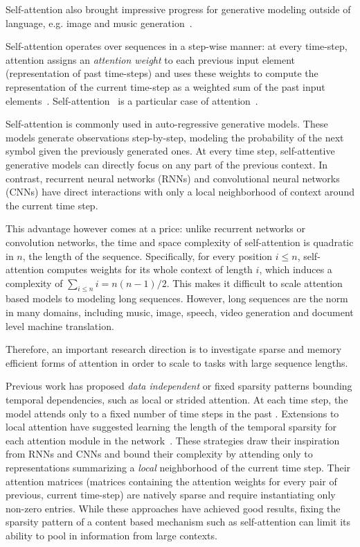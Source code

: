 Self-attention also brought impressive progress for generative modeling outside of language, e.g. image \citep{parmar2018image, menick2018generating, child2019generating} and music generation~\citep{huang2018music, child2019generating}.

Self-attention operates over sequences in a step-wise manner: at every time-step, attention assigns an \emph{attention weight} to each previous input element (representation of past time-steps) and uses these weights to compute the representation of the current time-step as a weighted sum of the past input elements~\citep{vaswani2017attention}. Self-attention~\citep{shaw2018self} is a particular case of attention~\citep{bahdanau2014neural,chorowski2015attention,luong2015effective}.

Self-attention is commonly used in auto-regressive generative models. These models generate observations step-by-step, modeling the probability of the next symbol given the previously generated ones. At every time step, self-attentive generative models can directly focus on any part of the previous context. In contrast, recurrent neural networks (RNNs) and convolutional neural networks (CNNs) have direct interactions with only a local neighborhood of context around the current time step. 

This advantage however comes at a price: unlike recurrent networks or convolution networks, the time and space complexity of self-attention is quadratic in $n$, the length of the sequence. Specifically, for every position $i \le n$, self-attention computes weights for its whole context of length $i$, which induces a complexity of $\sum_{i \le n} i = n (n-1)/2$. This makes it difficult to scale attention based models to modeling long sequences. However, long sequences are the norm in many domains, including music, image, speech, video generation and document level machine translation.

Therefore, an important research direction is to investigate sparse and memory efficient forms of attention in order to scale to tasks with large sequence lengths.

Previous work has proposed \emph{data independent} or fixed sparsity patterns bounding temporal dependencies, such as local or strided attention. At each time step, the model attends only to a fixed number of time steps in the past \citep{child2019generating}. Extensions to local attention have suggested learning the length of the temporal sparsity for each attention module in the network~\citep{sukhbaatar2019adaptive}. These strategies draw their inspiration from RNNs and CNNs and bound their complexity by attending only to representations summarizing a \emph{local}
neighborhood of the current time step. Their attention matrices (matrices containing the attention weights for every pair of previous, current time-step) are natively sparse and require instantiating only non-zero entries. While these approaches have achieved good results, fixing the sparsity pattern of a content based mechanism such as self-attention can limit its ability to pool in information from large contexts. 


